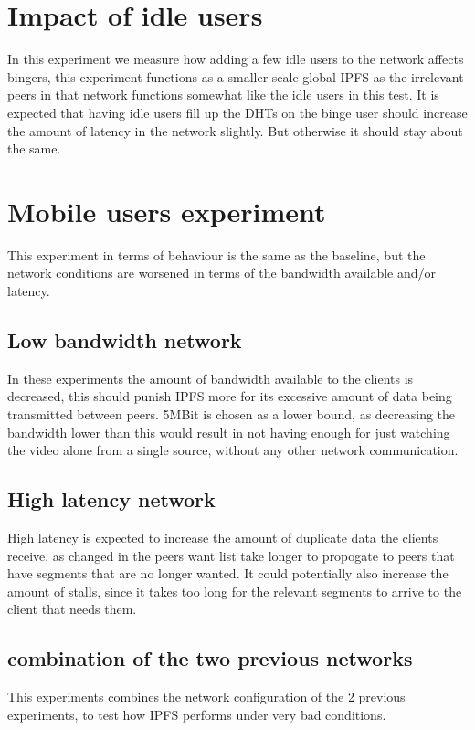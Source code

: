 \section{Impact of idle users}
In this experiment we measure how adding a few idle users to the network affects bingers, this experiment functions as a smaller scale global \acs{IPFS} as the irrelevant peers in that network functions somewhat like the idle users in this test. It is expected that having idle users fill up the \acs{DHT}s on the binge user should increase the amount of latency in the network slightly. But otherwise it should stay about the same.

\section{Mobile users experiment}
This experiment in terms of behaviour is the same as the baseline, but the network conditions are worsened  in terms of the bandwidth available and/or latency. 

\subsection{Low bandwidth network}
In these experiments the amount of bandwidth available to the clients is decreased, this should punish \acs{IPFS} more for its excessive amount of data being transmitted between peers. 5MBit is chosen as a lower bound, as decreasing the bandwidth lower than this would result in not having enough for just watching the video alone from a single source, without any other network communication.

\subsection{High latency network}
High latency is expected to increase the amount of duplicate data the clients receive, as changed in the peers want list take longer to propogate to peers that have segments that are no longer wanted. It could potentially also increase the amount of stalls, since it takes too long for the relevant segments to arrive to the client that needs them.

\subsection{combination of the two previous networks}
This experiments combines the network configuration of the 2 previous experiments, to test how \acs{IPFS} performs under very bad conditions. %

